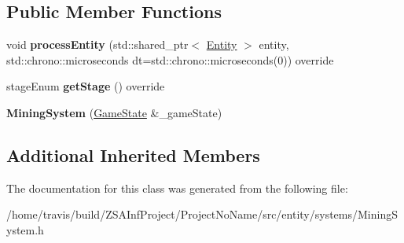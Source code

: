 \subsection*{Public Member Functions}
\begin{DoxyCompactItemize}
\item 
\hypertarget{classMiningSystem_ab34f96a8a6b5ee0c673314bcd77e2e08}{void {\bfseries process\-Entity} (std\-::shared\-\_\-ptr$<$ \hyperlink{classEntity}{Entity} $>$ entity, std\-::chrono\-::microseconds dt=std\-::chrono\-::microseconds(0)) override}\label{classMiningSystem_ab34f96a8a6b5ee0c673314bcd77e2e08}

\item 
\hypertarget{classMiningSystem_ad222882159d89eee402134c271c78829}{stage\-Enum {\bfseries get\-Stage} () override}\label{classMiningSystem_ad222882159d89eee402134c271c78829}

\item 
\hypertarget{classMiningSystem_abc38d633ab0b16ef0247b71e5516e0fa}{{\bfseries Mining\-System} (\hyperlink{classGameState}{Game\-State} \&\-\_\-game\-State)}\label{classMiningSystem_abc38d633ab0b16ef0247b71e5516e0fa}

\end{DoxyCompactItemize}
\subsection*{Additional Inherited Members}


The documentation for this class was generated from the following file\-:\begin{DoxyCompactItemize}
\item 
/home/travis/build/\-Z\-S\-A\-Inf\-Project/\-Project\-No\-Name/src/entity/systems/Mining\-System.\-h\end{DoxyCompactItemize}
